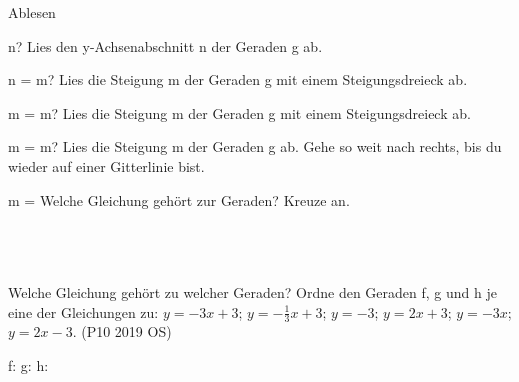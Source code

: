 \begin{aufgabe}{Ablesen}
\begin{teile}
\teil n? Lies den y-Achsenabschnitt n der Geraden g ab.

\begin{ksys}[xmin=-5,xmax=5,ymin=-5,ymax=5,ablesen]  \end{ksys}
n = \leerfeld
\teil m? Lies die Steigung m der Geraden g mit einem Steigungsdreieck ab.

\begin{ksys}[xmin=-5,xmax=5,ymin=-5,ymax=5,ablesen]  \end{ksys}
m = \leerfeld
\teil m? Lies die Steigung m der Geraden g mit einem Steigungsdreieck ab.

\begin{ksys}[xmin=-5,xmax=5,ymin=-5,ymax=5,ablesen]  \end{ksys}
m = \leerfeld
\teil m? Lies die Steigung m der Geraden g ab. Gehe so weit nach rechts, bis du wieder auf einer Gitterlinie bist.

\begin{ksys}[xmin=-5,xmax=5,ymin=-5,ymax=5,ablesen]  \end{ksys}
m = \leerfeld
\teil Welche Gleichung gehört zur Geraden? Kreuze an. \\  \\  \\  \\ 

\begin{ksys}[xmin=-5,xmax=5,ymin=-5,ymax=5,ablesen]  \end{ksys}
\teil Welche Gleichung gehört zu welcher Geraden? Ordne den Geraden f, g und h je eine der Gleichungen zu: $y = -3x + 3$; $y = -\frac{1}{3}x + 3$; $y = -3$; $y = 2x + 3$; $y = -3x$; $y = 2x - 3$. \hfill (P10 2019 OS) \\

\begin{ksys}[xmin=-5,xmax=5,ymin=-5,ymax=5,ablesen]    \end{ksys}
f: \leerfeld \quad g: \leerfeld \quad h: \leerfeld
\end{teile}
\end{aufgabe}

